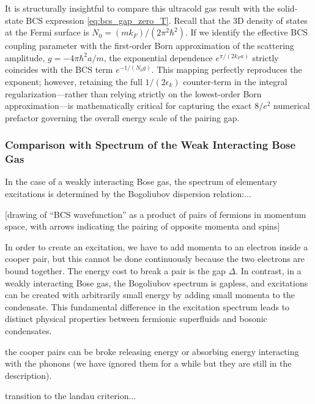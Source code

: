It is structurally insightful to compare this ultracold gas result with the solid-state BCS expression \eqref{eq:bcs_gap_zero_T}. Recall that the 3D density of states at the Fermi surface is \( N_0 = (m k_F)/(2\pi^2\hbar^2) \). If we identify the effective BCS coupling parameter with the first-order Born approximation of the scattering amplitude, \( g = -4\pi\hbar^2 a / m \), the exponential dependence \( e^{\pi/(2 k_F a)} \) strictly coincides with the BCS term \( e^{-1/(N_0 g)} \). This mapping perfectly reproduces the exponent; however, retaining the full \( 1/(2\epsilon_k) \) counter-term in the integral regularization—rather than relying strictly on the lowest-order Born approximation—is mathematically critical for capturing the exact \( 8/e^2 \) numerical prefactor governing the overall energy scale of the pairing gap.

\subsubsection{Comparison with Spectrum of the Weak Interacting Bose Gas}

In the case of a weakly interacting Bose gas, the spectrum of elementary excitations is determined by the Bogoliubov dispersion relation:...

[drawing of ``BCS wavefunction'' as a product of pairs of fermions in momentum space, with arrows indicating the pairing of opposite momenta and spins]

In order to create an excitation, we have to add momenta to an electron inside a cooper pair, but this cannot be done continuously because the two electrons are bound together. The energy cost to break a pair is the gap \( \Delta \). In contrast, in a weakly interacting Bose gas, the Bogoliubov spectrum is gapless, and excitations can be created with arbitrarily small energy by adding small momenta to the condensate. This fundamental difference in the excitation spectrum leads to distinct physical properties between fermionic superfluids and bosonic condensates.

the cooper pairs can be broke releasing energy or absorbing energy interacting with the phonons (we have ignored them for a while but they are still in the description).

transition to the landau criterion...


















